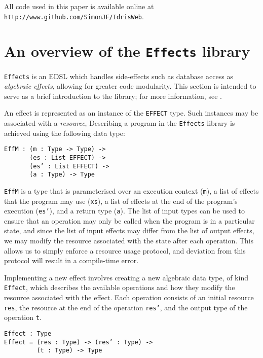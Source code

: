 \documentclass[preprint]{sigplanconf}
\begin{document}
All code used in this paper is available online at \\ \verb+http://www.github.com/SimonJF/IdrisWeb+.

\section{An overview of the \texttt{Effects} library}
\texttt{Effects} \cite{effects} is an EDSL which handles side-effects such as database access as \textit{algebraic effects}, allowing for greater code modularity. This section is intended to serve as a brief introduction to the library; for more information, see \cite{effects}.

An effect is represented as an instance of the \texttt{EFFECT} type. Such instances may be associated with a \textit{resource}, 
Describing a program in the \texttt{Effects} library is achieved using the following data type:
\begin{verbatim}
EffM : (m : Type -> Type) ->
       (es : List EFFECT) ->
       (es’ : List EFFECT) ->
       (a : Type) -> Type
\end{verbatim}

\texttt{EffM} is a type that is parameterised over an execution context (\texttt{m}), a list of effects that the program may use (\texttt{xs}), a list of effects at the end of the program's execution (\texttt{es'}), and a return type (\texttt{a}). The list of input types can be used to ensure that an operation may only be called when the program is in a particular state, and since the list of input effects may differ from the list of output effects, we may modify the resource associated with the state after each operation. This allows us to simply enforce a resource usage protocol, and deviation from this protocol will result in a compile-time error.

Implementing a new effect involves creating a new algebraic data type, of kind \texttt{Effect}, which describes the available operations and how they modify the resource associated with the effect. Each operation consists of an initial resource \texttt{res}, the resource at the end of the operation \texttt{res'}, and the output type of the operation \texttt{t}.

\begin{verbatim}
Effect : Type
Effect = (res : Type) -> (res’ : Type) ->
         (t : Type) -> Type
\end{verbatim}
\end{document}
